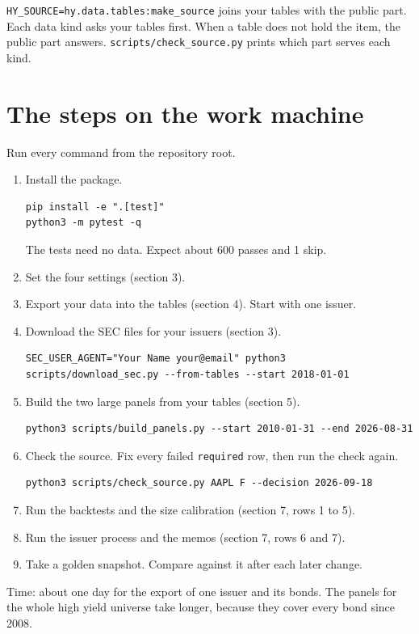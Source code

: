 \documentclass[10.5pt,a4paper]{article}
\newcommand{\code}[1]{\texttt{\small #1}}
\begin{document}
\code{HY\_\allowbreak{}SOURCE=hy.data.tables:make\_\allowbreak{}source} joins your tables with the public part. Each data kind asks your tables first. When a table does not hold the item, the public part answers. \code{scripts/\allowbreak{}check\_\allowbreak{}source.py} prints which part serves each kind.

\section{The steps on the work machine}

Run every command from the repository root.

\begin{enumerate}
\item Install the package.
\begin{lstlisting}
pip install -e ".[test]"
python3 -m pytest -q
\end{lstlisting}
The tests need no data. Expect about 600 passes and 1 skip.
\item Set the four settings (section 3).
\item Export your data into the tables (section 4). Start with one issuer.
\item Download the SEC files for your issuers (section 3).
\begin{lstlisting}
SEC_USER_AGENT="Your Name your@email" python3 scripts/download_sec.py --from-tables --start 2018-01-01
\end{lstlisting}
\item Build the two large panels from your tables (section 5).
\begin{lstlisting}
python3 scripts/build_panels.py --start 2010-01-31 --end 2026-08-31
\end{lstlisting}
\item Check the source. Fix every failed \code{required} row, then run the check again.
\begin{lstlisting}
python3 scripts/check_source.py AAPL F --decision 2026-09-18
\end{lstlisting}
\item Run the backtests and the size calibration (section 7, rows 1 to 5).
\item Run the issuer process and the memos (section 7, rows 6 and 7).
\item Take a golden snapshot. Compare against it after each later change.
\end{enumerate}

Time: about one day for the export of one issuer and its bonds. The panels for the whole high yield universe take longer, because they cover every bond since 2008.
\end{document}
